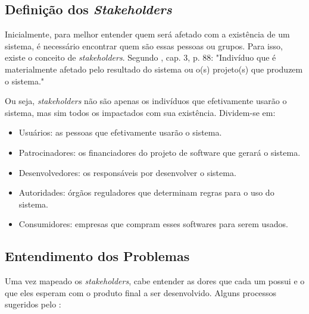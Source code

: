 \subsection{Definição dos \textit{Stakeholders}}
Inicialmente, para melhor entender quem será afetado com a existência de um sistema, é necessário encontrar quem são essas pessoas ou grupos. Para isso, existe o conceito de \textit{stakeholders}. Segundo \citeauthor{kurtbittnerianspence2002}, cap. 3, p. 88: "Indivíduo que é materialmente afetado pelo resultado do sistema ou o(s) projeto(s) que produzem o sistema."

Ou seja, \textit{stakeholders} não são apenas os indivíduos que efetivamente usarão o sistema, mas sim todos os impactados com sua existência. Dividem-se em:

\begin{itemize}
    \item Usuários: as pessoas que efetivamente usarão o sistema.
    \item Patrocinadores: os financiadores do projeto de software que gerará o sistema.
    \item Desenvolvedores: os responsáveis por desenvolver o sistema.
    \item Autoridades: órgãos reguladores que determinam regras para o uso do sistema.
    \item Consumidores: empresas que compram esses softwares para serem usados.
\end{itemize}

\subsection{Entendimento dos Problemas}
Uma vez mapeado os \textit{stakeholders}, cabe entender as dores que cada um possui e o que eles esperam com o produto final a ser desenvolvido. Alguns processos sugeridos pelo \citeauthor{kurtbittnerianspence2002}:

